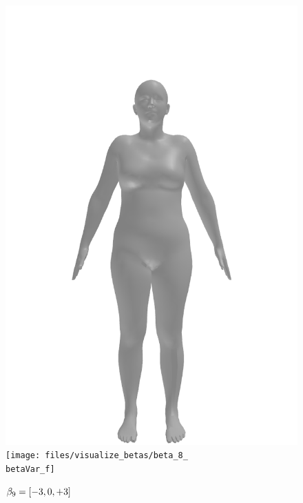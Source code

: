 \begin{figure}[ht!]
\begin{minipage}[b]{\textwidth}
        \includegraphics[width=\imgWidth]{files/visualize_betas/baseline_f}
        \texttt{[image: files/visualize\_betas/beta\_8\_\\betaVar\_f]}
        \caption{$\beta_9 = [-3, 0, +3]$}
    \end{minipage}
\end{figure}

